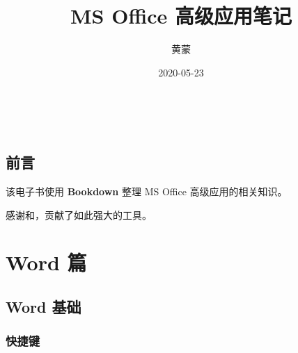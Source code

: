 \documentclass[]{ctexbook}
\title{MS Office 高级应用笔记}
\author{黄蒙}
\date{2020-05-23}
\begin{document}
\maketitle

{
\setcounter{tocdepth}{2}
\tableofcontents
}
\listoftables
\listoffigures

　　

\mainmatter

\hypertarget{ux524dux8a00}{%
\chapter*{前言}\label{ux524dux8a00}}


该电子书使用 \textbf{Bookdown} 整理 MS Office 高级应用的相关知识。

感谢\citep{R-bookdown}和\citep{R-bookdownplus}，贡献了如此强大的工具。

\cleardoublepage

\hypertarget{part-word-ux7bc7}{%
\part{Word 篇}\label{part-word-ux7bc7}}

\hypertarget{chapter-word-basic}{%
\chapter{Word 基础}\label{chapter-word-basic}}

\hypertarget{word-shortcut}{%
\section{快捷键}\label{word-shortcut}}
\end{document}
